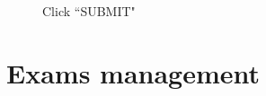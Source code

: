 \documentclass[ManualeUtente]{subfiles}
\begin{document}
\begin{enumerate}
	\begin{figure}[H]
		\centering
		\caption{Click ``SUBMIT"}
		\label{fig:Click "SUBMIT"}
	\end{figure}
\end{enumerate}

\section{Exams management}
\end{document}
